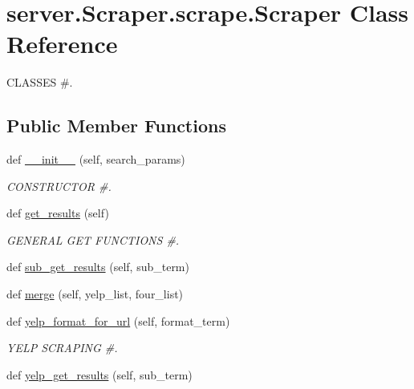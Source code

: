 \hypertarget{classserver_1_1_scraper_1_1scrape_1_1_scraper}{}\section{server.\+Scraper.\+scrape.\+Scraper Class Reference}
\label{classserver_1_1_scraper_1_1scrape_1_1_scraper}


C\+L\+A\+S\+S\+ES \#.  


\subsection*{Public Member Functions}
\begin{DoxyCompactItemize}
\item 
def \mbox{\hyperlink{classserver_1_1_scraper_1_1scrape_1_1_scraper_a95f25aa269db339cee574652685b4ec3}{\+\_\+\+\_\+init\+\_\+\+\_\+}} (self, search\+\_\+params)
\begin{DoxyCompactList}\small\item\em C\+O\+N\+S\+T\+R\+U\+C\+T\+OR \#. \end{DoxyCompactList}\item 
def \mbox{\hyperlink{classserver_1_1_scraper_1_1scrape_1_1_scraper_a8500c13f880e66623effd042f763c0fb}{get\+\_\+results}} (self)
\begin{DoxyCompactList}\small\item\em G\+E\+N\+E\+R\+AL G\+ET F\+U\+N\+C\+T\+I\+O\+NS \#. \end{DoxyCompactList}\item 
def \mbox{\hyperlink{classserver_1_1_scraper_1_1scrape_1_1_scraper_a5cc21814060959ee46bbde9cc7d7bbda}{sub\+\_\+get\+\_\+results}} (self, sub\+\_\+term)
\item 
def \mbox{\hyperlink{classserver_1_1_scraper_1_1scrape_1_1_scraper_a2810e31c93ef85447245822eaea9f8ac}{merge}} (self, yelp\+\_\+list, four\+\_\+list)
\item 
def \mbox{\hyperlink{classserver_1_1_scraper_1_1scrape_1_1_scraper_ab6b8f8032bc10cbe520e5310703b8a9b}{yelp\+\_\+format\+\_\+for\+\_\+url}} (self, format\+\_\+term)
\begin{DoxyCompactList}\small\item\em Y\+E\+LP S\+C\+R\+A\+P\+I\+NG \#. \end{DoxyCompactList}\item 
def \mbox{\hyperlink{classserver_1_1_scraper_1_1scrape_1_1_scraper_a90576b2f821edab37becd682ad41654c}{yelp\+\_\+get\+\_\+results}} (self, sub\+\_\+term)

\end{DoxyCompactItemize}
